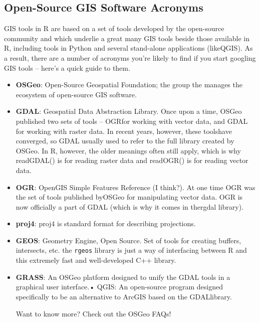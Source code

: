 \documentclass[10pt]{article}
\begin{document}
\hrulefill
\subsection*{Open-Source GIS Software Acronyms}
GIS tools in R are based on a set of tools developed by the open-source community and which underlie a great many GIS tools beside those available in R, including tools in Python and several stand-alone applications (likeQGIS). As a result, there are a number of acronyms you’re likely to find if you start googling GIS tools – here’s a quick guide to them.
\begin{itemize}
	\item \textbf{OSGeo}: Open-Source Geospatial Foundation; the group the manages the ecosystem of open-source GIS software.
	\item \textbf{GDAL}: Geospatial Data Abstraction Library. Once upon a time, OSGeo published two sets of tools – OGRfor working with vector data, and GDAL for working with raster data. In recent years, however, these toolshave converged, so GDAL usually used to refer to the full library created by OSGeo. In R, however, the older meanings often still apply, which is why readGDAL() is for reading raster data and readOGR() is for reading vector data.
	\item \textbf{OGR}: OpenGIS Simple Features Reference (I think?). At one time OGR was the set of tools published byOSGeo for manipulating vector data. OGR is now officially a part of GDAL (which is why it comes in thergdal library).
	\item \textbf{proj4}: proj4 is standard format for describing projections.
	\item \textbf{GEOS}: Geometry Engine, Open Source. Set of tools for creating buffers, intersects, etc. the \texttt{rgeos} library is just a way of interfacing between R and this extremely fast and well-developed C++ library. 
	\item \textbf{GRASS}: An OSGeo platform designed to unify the GDAL tools in a graphical user interface.• QGIS: An open-source program designed specifically to be an alternative to ArcGIS based on the GDALlibrary.
	
Want to know more? Check out the OSGeo FAQs!

\end{itemize}
\end{document}
